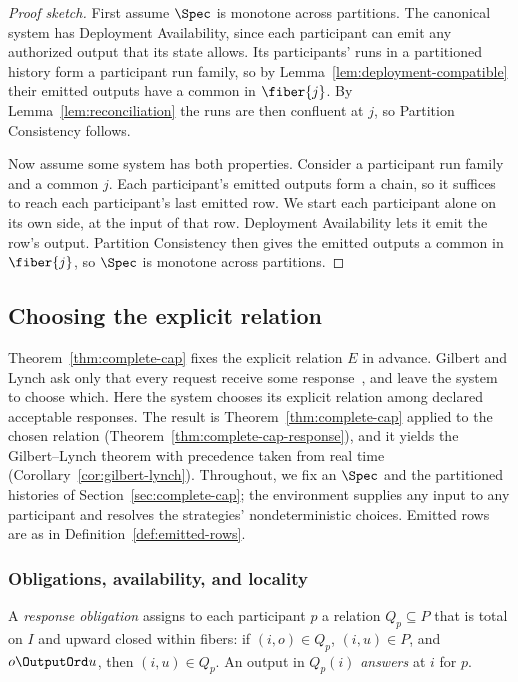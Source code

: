 \begin{proof}[Proof sketch]
First assume $\Spec$ is monotone across partitions.  The canonical system has
Deployment Availability, since each participant can emit any authorized output
that its state allows.  Its participants' runs in a partitioned history form a
participant run family, so by Lemma~\ref{lem:deployment-compatible} their
emitted outputs have a common \outnoun in $\fiber{j}$.  By
Lemma~\ref{lem:reconciliation} the runs are then confluent at $j$, so
Partition Consistency follows.

Now assume some system has both properties.  Consider a participant run
family and a common \indesc $j$.  Each participant's emitted outputs form a
chain, so it suffices to reach each participant's last emitted row.  We start
each participant alone on its own side, at the input of that row.  Deployment
Availability lets it emit the row's output.  Partition Consistency then gives
the emitted outputs a common \outnoun in $\fiber{j}$, so $\Spec$ is monotone
across partitions.
\end{proof}

\subsection{Choosing the explicit relation}
\label{app:cap-response}

Theorem~\ref{thm:complete-cap} fixes the explicit relation $E$ in advance.
Gilbert and Lynch ask only that every request receive some
response~\cite{gilbert2002cap}, and leave the system to choose which.  Here
the system chooses its explicit relation among declared acceptable responses.
The result is Theorem~\ref{thm:complete-cap} applied to the chosen relation
(Theorem~\ref{thm:complete-cap-response}), and it yields the Gilbert--Lynch
theorem with precedence taken from real time (Corollary~\ref{cor:gilbert-lynch}).
Throughout, we fix an \spectype $\Spec$ and the partitioned histories of
Section~\ref{sec:complete-cap}; the environment supplies any input to any
participant and resolves the strategies' nondeterministic choices.  Emitted
rows are as in Definition~\ref{def:emitted-rows}.

\subsubsection{Obligations, availability, and locality}

\begin{definition}
\label{def:response-obligation}
A \emph{response obligation} assigns to each participant $p$ a relation
$Q_p\subseteq P$ that is total on $I$ and upward closed within fibers: if
$(i,o)\in Q_p$, $(i,u)\in P$, and $o\OutputOrd u$, then $(i,u)\in Q_p$.  An
output in $Q_p(i)$ \emph{answers} at $i$ for $p$.
\end{definition}

